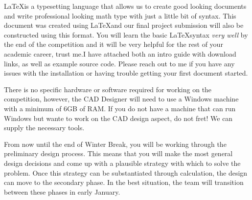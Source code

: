 \documentclass{article}
\begin{document}
\vspace{1pc}
\noindent {\bfseries \LaTeX}

\LaTeX is a typesetting language that allows us to create good looking documents and write professional looking math type with just a little bit of syntax. This document was created using \LaTeX and our final project submission will also be constructed using this format. You will learn the basic \LaTeX syntax \emph{very well} by the end of the competition and it will be very helpful for the rest of your academic career, trust me.I have attached both an intro guide with download links, as well as example source code. Please reach out to me if you have any issues with the installation or having trouble getting your first document started.


\vspace{1pc}

There is no specific hardware or software required for working on the competition, however, the CAD Designer will need to use a Windows machine with a minimum of 6GB of RAM. If you do not have a machine that can run Windows but wante to work on the CAD design aspect, do not fret! We can supply the necessary tools.



\vspace{1pc}

From now until the end of Winter Break, you will be working through the preliminary design process. This means that you will make the most general design decisions and come up with a plausible strategy with which to solve the problem. Once this strategy can be substantiated through calculation, the design can move to the secondary phase. In the best situation, the team will transition between these phases in early January.
\end{document}

